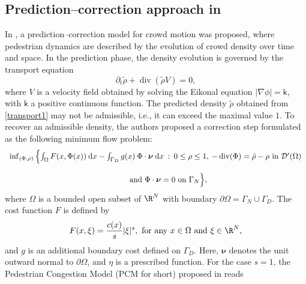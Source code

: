 \documentclass[final,reqno]{amsart}
\theoremstyle{plain}
\theoremstyle{definition}
\theoremstyle{remark}
\numberwithin{remark}{section}	%
\numberwithin{example}{section}	%
\DeclareMathOperator{\dive}{div}
\newcommand{\D}{\mathcal D}
\newcommand{\ie}{i.e.,\xspace}	%
\newcommand{\kk}{\mathsf{k}}
\newcommand{\dd}{\mathrm{d}}
\newcommand{\bnu}{\boldsymbol{\nu}}
\begin{document}
\subsection{Prediction–correction approach in \cite{ennaji2023prediction}}
In \cite{ennaji2023prediction}, a prediction–correction model for crowd motion was proposed, where pedestrian dynamics are described by the evolution of crowd density over time and space.
In the prediction phase, the density evolution is governed by the transport equation
\begin{equation}\label{transport1}
\partial_t \tilde \rho + \dive(\tilde \rho V) = 0,
\end{equation}
where $V$ is a velocity field obtained by solving the Eikonal equation
$\vert\nabla \phi\vert = \kk$,
with $\kk$ a positive continuous function.
The predicted density $\tilde \rho$ obtained from \eqref{transport1} may not be admissible, \ie it can exceed the maximal value $1$.
To recover an admissible density, the authors proposed a correction step formulated as the following minimum flow problem:
\begin{equation}\label{minproc}
	\begin{array}{c}
		\inf_{(\Phi,\rho)}\left \{  \int_\Omega F(x,  \Phi  (x) )\: \dd x -  \int_{\Gamma_D} g(x)\: \Phi\cdot\bnu \:  \dd x   \: :\:    0\leq \rho\leq 1,\:   -\dive(\Phi)  =\tilde \rho -\rho   \hbox{ in }   \D'(  \Omega )   \right.  \\   \\  \hspace*{1cm}       \hbox { and }   \Phi\cdot \bnu =0  \hbox{ on }\Gamma_N        \Big\},
	\end{array}
\end{equation} 
where $\Omega$ is a bounded open subset of $\R^N$ with boundary $\partial\Omega = \Gamma_N \cup \Gamma_D$. The cost function $F$ is defined by
\[
F(x,\xi)=\frac{c(x)}{s}\vert \xi \vert ^s, \hbox{ for any } x\in \Omega \hbox{ and } \xi \in \R^N,
\]
and $g$ is an additional boundary cost defined on $\Gamma_D$.
Here, $\bnu$ denotes the unit outward normal to $\partial\Omega$, and $\eta$ is a prescribed function. For the case $s=1$, the Pedestrian Congestion Model (PCM for short) proposed in \cite{ennaji2023prediction} reads
\end{document}
